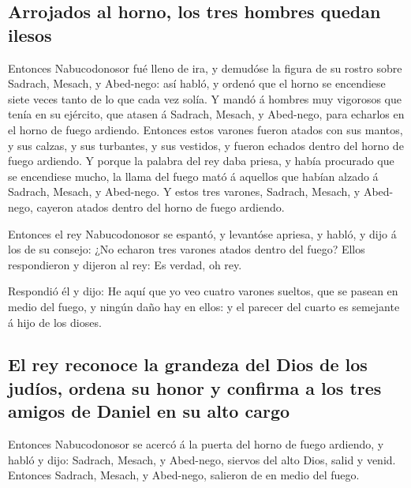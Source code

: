 \hypertarget{arrojados-al-horno-los-tres-hombres-quedan-ilesos}{%
\subsection{Arrojados al horno, los tres hombres quedan
ilesos}\label{arrojados-al-horno-los-tres-hombres-quedan-ilesos}}

 Entonces Nabucodonosor fué lleno de ira, y demudóse la
figura de su rostro sobre Sadrach, Mesach, y Abed-nego: así habló, y
ordenó que el horno se encendiese siete veces tanto de lo que cada vez
solía.  Y mandó á hombres muy vigorosos que tenía en su
ejército, que atasen á Sadrach, Mesach, y Abed-nego, para echarlos en el
horno de fuego ardiendo.  Entonces estos varones fueron
atados con sus mantos, y sus calzas, y sus turbantes, y sus vestidos, y
fueron echados dentro del horno de fuego ardiendo.  Y
porque la palabra del rey daba priesa, y había procurado que se
encendiese mucho, la llama del fuego mató á aquellos que habían alzado á
Sadrach, Mesach, y Abed-nego.  Y estos tres varones,
Sadrach, Mesach, y Abed-nego, cayeron atados dentro del horno de fuego
ardiendo.

 Entonces el rey Nabucodonosor se espantó, y levantóse
apriesa, y habló, y dijo á los de su consejo: ¿No echaron tres varones
atados dentro del fuego? Ellos respondieron y dijeron al rey: Es verdad,
oh rey.

 Respondió él y dijo: He aquí que yo veo cuatro varones
sueltos, que se pasean en medio del fuego, y ningún daño hay en ellos: y
el parecer del cuarto es semejante á hijo de los dioses.

\hypertarget{el-rey-reconoce-la-grandeza-del-dios-de-los-juduxedos-ordena-su-honor-y-confirma-a-los-tres-amigos-de-daniel-en-su-alto-cargo}{%
\subsection{El rey reconoce la grandeza del Dios de los judíos, ordena
su honor y confirma a los tres amigos de Daniel en su alto
cargo}\label{el-rey-reconoce-la-grandeza-del-dios-de-los-juduxedos-ordena-su-honor-y-confirma-a-los-tres-amigos-de-daniel-en-su-alto-cargo}}

 Entonces Nabucodonosor se acercó á la puerta del horno de
fuego ardiendo, y habló y dijo: Sadrach, Mesach, y Abed-nego, siervos
del alto Dios, salid y venid. Entonces Sadrach, Mesach, y Abed-nego,
salieron de en medio del fuego.


